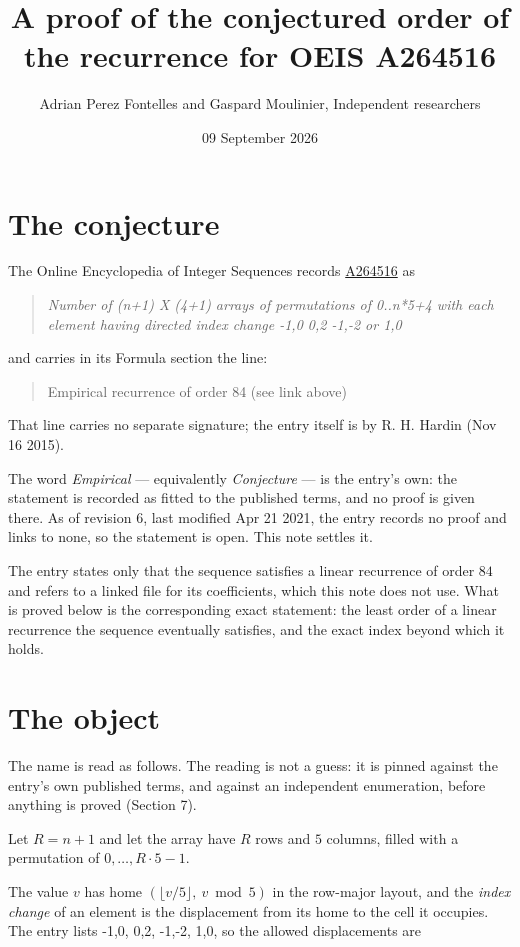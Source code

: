 \documentclass[11pt]{article}
\title{A proof of the conjectured order of the recurrence for OEIS A264516}
\author{Adrian Perez Fontelles and Gaspard Moulinier, Independent researchers}
\date{09 September 2026}
\theoremstyle{definition}
\begin{document}
\maketitle
\section{The conjecture}

The Online Encyclopedia of Integer Sequences records \href{https://oeis.org/A264516}{A264516} as

\begin{quote}\itshape Number of (n+1) X (4+1) arrays of permutations of 0..n*5+4 with each element having directed index change -1,0 0,2 -1,-2 or 1,0\end{quote}

and carries in its Formula section the line:

\begin{quote}\ttfamily Empirical recurrence of order 84 (see link above)\end{quote}

That line carries no separate signature; the entry itself is by R. H. Hardin (Nov 16 2015).

The word {\itshape Empirical} --- equivalently {\itshape Conjecture} --- is the entry's own: the statement is recorded as fitted to the published terms, and no proof is given there. As of revision 6, last modified Apr 21 2021, the entry records no proof and links to none, so the statement is open. This note settles it.

The entry states only that the sequence satisfies a linear recurrence of order $84$ and refers to a linked file for its coefficients, which this note does not use. What is proved below is the corresponding exact statement: the least order of a linear recurrence the sequence eventually satisfies, and the exact index beyond which it holds.

\section{The object}

The name is read as follows. The reading is not a guess: it is pinned against the entry's own published terms, and against an independent enumeration, before anything is proved (Section 7).

Let $R = n + 1$ and let the array have $R$ rows and $5$ columns, filled with a permutation of $0,\dots,R\cdot5-1$.

The value $v$ has home $(\lfloor v/5\rfloor,\ v \bmod 5)$ in the row-major layout, and the {\itshape index change} of an element is the displacement from its home to the cell it occupies. The entry lists -1,0, 0,2, -1,-2, 1,0, so the allowed displacements are
\end{document}
